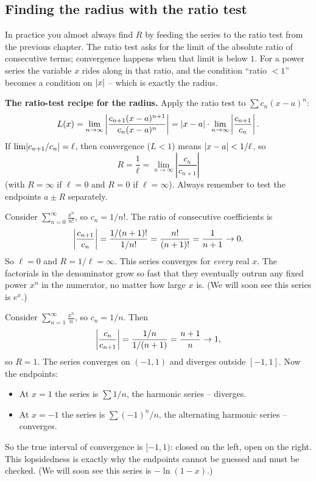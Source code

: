 \subsection{Finding the radius with the ratio test}

In practice you almost always find $R$ by feeding the series to the ratio test from the previous chapter. The ratio test asks for the limit of the absolute ratio of consecutive terms; convergence happens when that limit is below $1$. For a power series the variable $x$ rides along in that ratio, and the condition ``ratio $< 1$'' becomes a condition on $\lvert x\rvert$ -- which is exactly the radius.

\begin{focusbox}
\textbf{The ratio-test recipe for the radius.} Apply the ratio test to $\sum c_n(x-a)^n$:
\[
  L(x) = \lim_{n\to\infty}\left|\frac{c_{n+1}(x-a)^{n+1}}{c_n(x-a)^n}\right|
       = \lvert x-a\rvert\cdot \lim_{n\to\infty}\left|\frac{c_{n+1}}{c_n}\right|.
\]
If $\lim \lvert c_{n+1}/c_n\rvert = \ell$, then convergence ($L<1$) means $\lvert x-a\rvert < 1/\ell$, so
\[
  \boxed{\,R = \frac{1}{\ell} = \lim_{n\to\infty}\left|\frac{c_n}{c_{n+1}}\right|\,}
\]
(with $R=\infty$ if $\ell=0$ and $R=0$ if $\ell=\infty$). Always remember to test the endpoints $a\pm R$ separately.
\end{focusbox}

\begin{example}
\label{ch30:ex-exp-radius}
Consider $\displaystyle\sum_{n=0}^{\infty}\frac{x^n}{n!}$, so $c_n = 1/n!$. The ratio of consecutive coefficients is
\[
  \left|\frac{c_{n+1}}{c_n}\right| = \frac{1/(n+1)!}{1/n!} = \frac{n!}{(n+1)!} = \frac{1}{n+1} \to 0.
\]
So $\ell = 0$ and $R = 1/\ell = \infty$. This series converges for \emph{every} real $x$. The factorials in the denominator grow so fast that they eventually outrun any fixed power $x^n$ in the numerator, no matter how large $x$ is. (We will soon see this series is $e^x$.)
\end{example}

\begin{example}
\label{ch30:ex-ln-radius}
Consider $\displaystyle\sum_{n=1}^{\infty}\frac{x^n}{n}$, so $c_n = 1/n$. Then
\[
  \left|\frac{c_n}{c_{n+1}}\right| = \frac{1/n}{1/(n+1)} = \frac{n+1}{n} \to 1,
\]
so $R = 1$. The series converges on $(-1,1)$ and diverges outside $[-1,1]$. Now the endpoints:
\begin{itemize}
  \item At $x = 1$ the series is $\sum 1/n$, the harmonic series -- diverges.
  \item At $x = -1$ the series is $\sum (-1)^n/n$, the alternating harmonic series -- converges.
\end{itemize}
So the true interval of convergence is $[-1, 1)$: closed on the left, open on the right. This lopsidedness is exactly why the endpoints cannot be guessed and must be checked. (We will soon see this series is $-\ln(1-x)$.)
\end{example}


